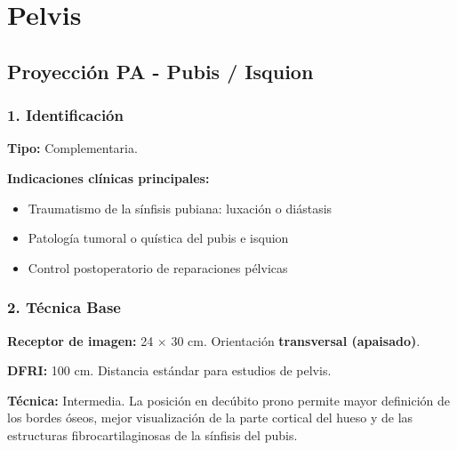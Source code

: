 		
		\twocolumn
		\clearpage
		
	
	
		
		\section{Pelvis}
		
		\subsection{Proyección PA - Pubis / Isquion}
		
		\subsubsection*{1. Identificación}
		
		\textbf{Tipo:} Complementaria.
		
		\textbf{Indicaciones clínicas principales:}
		\begin{itemize}
			\item Traumatismo de la sínfisis pubiana: luxación o diástasis
			\item Patología tumoral o quística del pubis e isquion
			\item Control postoperatorio de reparaciones pélvicas
		\end{itemize}
		
		\subsubsection*{2. Técnica Base}
		
		\textbf{Receptor de imagen:} 24 $\times$ 30 cm. Orientación \textbf{transversal (apaisado)}.
		
		\textbf{DFRI:} 100 cm. Distancia estándar para estudios de pelvis.
		
		\textbf{Técnica:} Intermedia. La posición en decúbito prono permite mayor definición de los bordes óseos, mejor visualización de la parte cortical del hueso y de las estructuras fibrocartilaginosas de la sínfisis del pubis.
		
